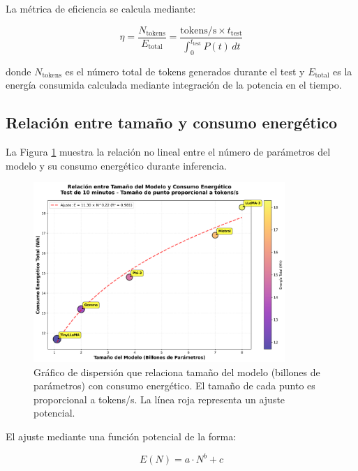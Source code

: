 La métrica de eficiencia se calcula mediante:

\begin{equation}
\eta = \frac{N_{\text{tokens}}}{E_{\text{total}}} = \frac{\text{tokens/s} \times t_{\text{test}}}{\int_0^{t_{\text{test}}} P(t) \, dt}
\end{equation}

donde $N_{\text{tokens}}$ es el número total de tokens generados durante el test y $E_{\text{total}}$ es la energía consumida calculada mediante integración de la potencia en el tiempo.

\subsection{Relación entre tamaño y consumo energético}

La Figura \ref{fig:dispersion_tamano} muestra la relación no lineal entre el número de parámetros del modelo y su consumo energético durante inferencia.

\begin{figure}[H]
    \centering
    \includegraphics[width=0.85\textwidth]{figuras/png/grafico_2_dispersion_tamano_consumo.png}
    \caption{Gráfico de dispersión que relaciona tamaño del modelo (billones de parámetros) con consumo energético. El tamaño de cada punto es proporcional a tokens/s. La línea roja representa un ajuste potencial.}
    \label{fig:dispersion_tamano}
\end{figure}

El ajuste mediante una función potencial de la forma:

\begin{equation}
E(N) = a \cdot N^b + c
\end{equation}


